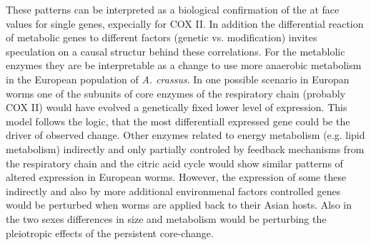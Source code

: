 These patterns can be interpreted as a biological confirmation of the
at face values for single genes, expecially for COX II. In addition
the differential reaction of metabolic genes to different factors
(genetic vs. modification) invites speculation on a causal structur
behind these correlations. For the metablolic enzymes they are be
interpretable as a change to use more anaerobic metabolism in the
European population of \textit{A. crassus}. In one possible scenario
in Europan worms one of the subunits of core enzymes of the
respiratory chain (probably COX II) would have evolved a genetically
fixed lower level of expression. This model follows the logic, that
the most differentiall expressed gene could be the driver of observed
change. Other enzymes related to energy metabolism (e.g. lipid
metabolism) indirectly and only partially controled by feedback
mechanisms from the respiratory chain and the citric acid cycle would
show similar patterns of altered expression in European
worms. However, the expression of some these indirectly and also by
more additional environmenal factors controlled genes would be
perturbed when worms are applied back to their Asian hosts. Also in
the two sexes differences in size and metabolism would be perturbing
the pleiotropic effects of the persistent core-change.


